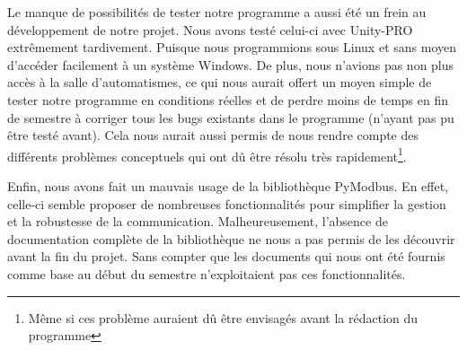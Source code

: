 \documentclass[12pt]{report}    %
\begin{document}
\smallSkip

Le manque de possibilités de tester notre programme a aussi été un frein au développement de notre projet. Nous avons testé celui-ci avec Unity-PRO extrêmement tardivement.\newline
Puisque nous programmions sous Linux et sans moyen d'accéder facilement à un système Windows.\newline
De plus, nous n'avions pas non plus accès à la salle d'automatismes, ce qui nous aurait offert un moyen simple de tester notre programme en conditions réelles et de perdre moins de temps en fin de semestre à corriger tous les bugs existants dans le programme (n'ayant pas pu être testé avant). Cela nous aurait aussi permis de nous rendre compte des différents problèmes conceptuels qui ont dû être résolu très rapidement\footnote{Même si ces problème auraient dû être envisagés avant la rédaction du programme}.

\smallSkip

Enfin, nous avons fait un mauvais usage de la bibliothèque PyModbus. En effet, celle-ci semble proposer de nombreuses fonctionnalités pour simplifier la gestion et la robustesse de la communication. Malheureusement, l'absence de documentation complète de la bibliothèque ne nous a pas permis de les découvrir avant la fin du projet. Sans compter que les documents qui nous ont été fournis comme base au début du semestre n'exploitaient pas ces fonctionnalités.
\end{document}
